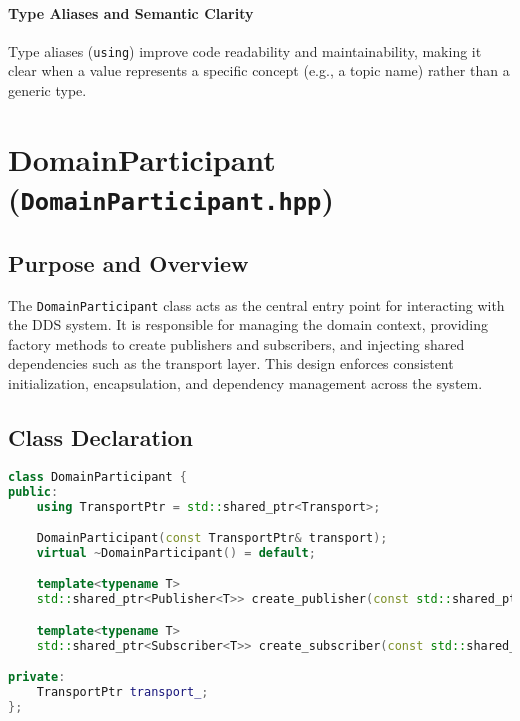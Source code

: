 \documentclass[12pt]{report}
\begin{document}
\paragraph{Type Aliases and Semantic Clarity}
Type aliases (\texttt{using}) improve code readability and maintainability, making it clear when a value represents a specific concept (e.g., a topic name) rather than a generic type.

\section{DomainParticipant (\texttt{DomainParticipant.hpp})}

\subsection{Purpose and Overview}
The \texttt{DomainParticipant} class acts as the central entry point for interacting with the DDS system. It is responsible for managing the domain context, providing factory methods to create publishers and subscribers, and injecting shared dependencies such as the transport layer. This design enforces consistent initialization, encapsulation, and dependency management across the system.

\subsection{Class Declaration}
\begin{lstlisting}[language=C++]
class DomainParticipant {
public:
    using TransportPtr = std::shared_ptr<Transport>;

    DomainParticipant(const TransportPtr& transport);
    virtual ~DomainParticipant() = default;

    template<typename T>
    std::shared_ptr<Publisher<T>> create_publisher(const std::shared_ptr<Topic<T>>& topic);

    template<typename T>
    std::shared_ptr<Subscriber<T>> create_subscriber(const std::shared_ptr<Topic<T>>& topic);

private:
    TransportPtr transport_;
};
\end{lstlisting}
\end{document}

